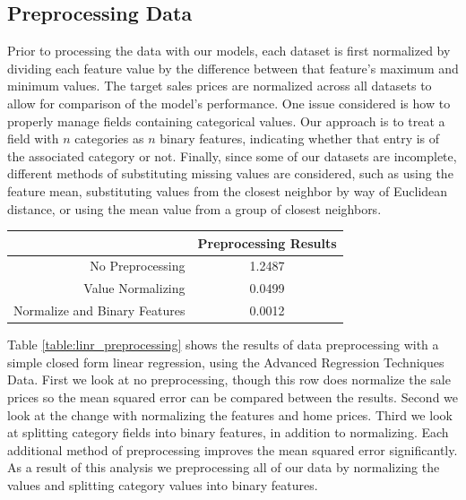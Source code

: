 \documentclass[10pt]{article}
\begin{document}
\begin{multicols}{2}
		\section{Preprocessing Data}
		Prior to processing the data with our models, each dataset is first normalized by dividing each feature value by the difference between that feature's maximum and minimum values. The target sales prices are normalized across all datasets to allow for comparison of the model's performance. One issue considered is how to properly manage fields containing categorical values. Our approach is to treat a field with \(n\) categories as \(n\) binary features, indicating whether that entry is of the associated category or not. Finally, since some of our datasets are incomplete, different methods of substituting missing values are considered, such as using the feature mean, substituting values from the closest neighbor by way of Euclidean distance, or using the mean value from a group of closest neighbors.
		{\centering
        	\captionsetup{type=table}
			\begin{tabular}{r|c}
				& \small{Preprocessing Results} \\
				\hline
				\small{No Preprocessing} & \small{1.2487} \\
				\hline
				\small{Value Normalizing} & \small{0.0499} \\
				\hline
				\small{Normalize and Binary Features} & \small{0.0012} \\
				\hline
			\end{tabular}
			\label{table:linr_preprocessing}
		\setlength{\parindent}{15pt} }
                \par
                Table \ref{table:linr_preprocessing} shows the results of data preprocessing with a simple closed form linear regression, using the Advanced Regression Techniques Data. First we look at no preprocessing, though this row does normalize the sale prices so the mean squared error can be compared between the results. Second we look at the change with normalizing the features and home prices. Third we look at splitting category fields into binary features, in addition to normalizing. Each additional method of preprocessing improves the mean squared error significantly. As a result of this analysis we preprocessing all of our data by normalizing the values and splitting category values into binary features.
                \par
		{\centering
        	\captionsetup{type=table}
}
\end{multicols}
\end{document}
